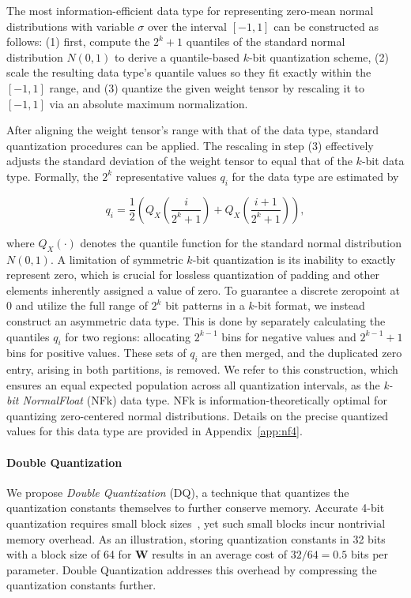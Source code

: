 The most information-efficient data type for representing zero-mean normal distributions with variable $\sigma$ over the interval $[-1, 1]$ can be constructed as follows: (1) first, compute the $2^k+1$ quantiles of the standard normal distribution $N(0, 1)$ to derive a quantile-based $k$-bit quantization scheme, (2) scale the resulting data type’s quantile values so they fit exactly within the $[-1, 1]$ range, and (3) quantize the given weight tensor by rescaling it to $[-1, 1]$ via an absolute maximum normalization.

After aligning the weight tensor’s range with that of the data type, standard quantization procedures can be applied. The rescaling in step (3) effectively adjusts the standard deviation of the weight tensor to equal that of the $k$-bit data type. Formally, the $2^k$ representative values $q_i$ for the data type are estimated by

\begin{equation}
q_i  = \frac{1}{2}\left( Q_X\left(\frac{i}{2^k+1}\right) + Q_X\left(\frac{i+1}{2^k+1}\right)\right),
\end{equation}

where $Q_X(\cdot)$ denotes the quantile function for the standard normal distribution $N(0,1)$. A limitation of symmetric $k$-bit quantization is its inability to exactly represent zero, which is crucial for lossless quantization of padding and other elements inherently assigned a value of zero. To guarantee a discrete zeropoint at $0$ and utilize the full range of $2^k$ bit patterns in a $k$-bit format, we instead construct an asymmetric data type. This is done by separately calculating the quantiles $q_i$ for two regions: allocating $2^{k-1}$ bins for negative values and $2^{k-1}+1$ bins for positive values. These sets of $q_i$ are then merged, and the duplicated zero entry, arising in both partitions, is removed. We refer to this construction, which ensures an equal expected population across all quantization intervals, as the \emph{k-bit NormalFloat} (NFk) data type. NFk is information-theoretically optimal for quantizing zero-centered normal distributions. Details on the precise quantized values for this data type are provided in Appendix~\ref{app:nf4}.

\paragraph{Double Quantization{}}
We propose \emph{Double Quantization} (DQ), a technique that quantizes the quantization constants themselves to further conserve memory. Accurate 4-bit quantization requires small block sizes~\citep{dettmers2022case}, yet such small blocks incur nontrivial memory overhead. As an illustration, storing quantization constants in 32 bits with a block size of 64 for $\mathbf{W}$ results in an average cost of $32/64 = 0.5$ bits per parameter. Double Quantization addresses this overhead by compressing the quantization constants further.

